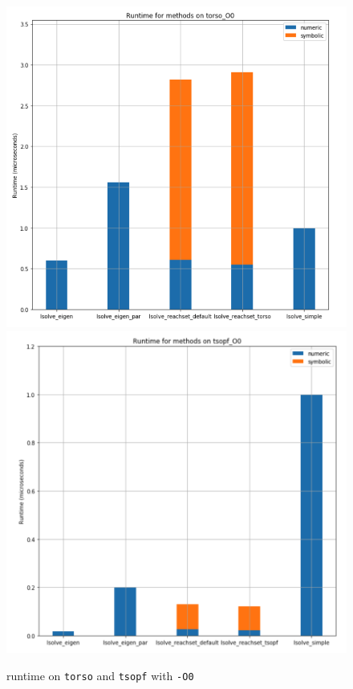 \documentclass[12pt]{article}
\begin{document}
  
\begin{figure}[ht]
    \begin{center}
        \includegraphics[width=5in]{runtime_torso_O0.png}
        \includegraphics[width=5in]{runtime_tsopf_O0.png}
    \end{center}
    \caption{\label{fig:1} runtime on \texttt{torso} and \texttt{tsopf} with \texttt{-O0}}
\end{figure}
\end{document}
